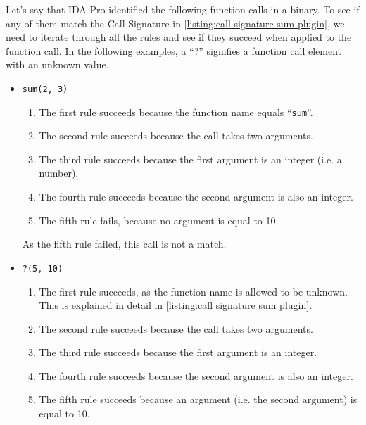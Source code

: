 Let's say that IDA Pro identified the following function calls in a binary. To see if any of them match the Call Signature in \autoref{listing:call signature sum plugin}, we need to iterate through all the rules and see if they succeed when applied to the function call. In the following examples, a ``?'' signifies a function call element with an unknown value.
\begin{itemize}
    \item \texttt{sum(2, 3)}
    \begin{enumerate}
        \item The first rule succeeds because the function name equals ``\texttt{sum}''.

        \item The second rule succeeds because the call takes two arguments.

        \item The third rule succeeds because the first argument is an integer (i.e. a number).

        \item The fourth rule succeeds because the second argument is also an integer.

        \item The fifth rule fails, because no argument is equal to 10.
    \end{enumerate}

    As the fifth rule failed, this call is not a match.

    \item \texttt{?(5, 10)}
    \begin{enumerate}
        \item The first rule succeeds, as the function name is allowed to be unknown. This is explained in detail in \autoref{listing:call signature sum plugin}.

        \item The second rule succeeds because the call takes two arguments.

        \item The third rule succeeds because the first argument is an integer.

        \item The fourth rule succeeds because the second argument is also an integer.

        \item The fifth rule succeeds because an argument (i.e. the second argument) is equal to 10.
    \end{enumerate}


\end{itemize}
